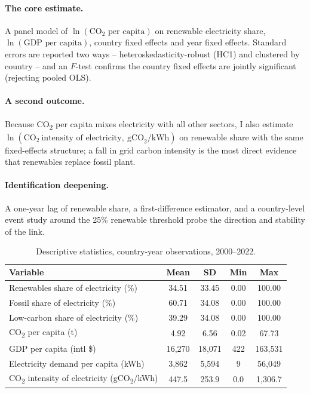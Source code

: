 \documentclass[11pt]{article}
\begin{document}
\paragraph{The core estimate.} A panel model of $\ln(\text{CO}_2\text{ per capita})$ on renewable electricity share, $\ln(\text{GDP per capita})$, country fixed effects and year fixed effects. Standard errors are reported two ways -- heteroskedasticity-robust (HC1) and clustered by country -- and an $F$-test confirms the country fixed effects are jointly significant (rejecting pooled OLS).
\paragraph{A second outcome.} Because CO\textsubscript{2} per capita mixes electricity with all other sectors, I also estimate $\ln(\text{CO}_2\ \text{intensity of electricity},\ \text{gCO}_2/\text{kWh})$ on renewable share with the same fixed-effects structure; a fall in grid carbon intensity is the most direct evidence that renewables replace fossil plant.
\paragraph{Identification deepening.} A one-year lag of renewable share, a first-difference estimator, and a country-level event study around the 25\% renewable threshold probe the direction and stability of the link.

\begin{table}[H]
\centering
\caption{Descriptive statistics, country-year observations, 2000--2022.}
\label{tab:desc}
\begin{tabular}{lcccc}
\toprule
Variable & Mean & SD & Min & Max \\
\midrule
Renewables share of electricity (\%) & 34.51 & 33.45 & 0.00 & 100.00 \\
Fossil share of electricity (\%) & 60.71 & 34.08 & 0.00 & 100.00 \\
Low-carbon share of electricity (\%) & 39.29 & 34.08 & 0.00 & 100.00 \\
CO\textsubscript{2} per capita (t) & 4.92 & 6.56 & 0.02 & 67.73 \\
GDP per capita (intl \$) & 16,270 & 18,071 & 422 & 163,531 \\
Electricity demand per capita (kWh) & 3,862 & 5,594 & 9 & 56,049 \\
CO\textsubscript{2} intensity of electricity (gCO\textsubscript{2}/kWh) & 447.5 & 253.9 & 0.0 & 1,306.7 \\
\bottomrule
\end{tabular}
\end{table}
\end{document}
